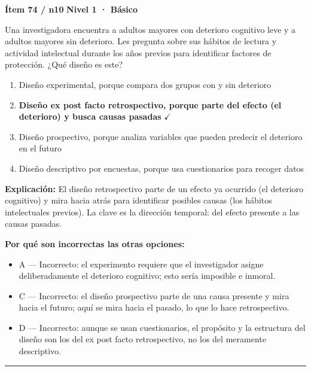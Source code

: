 \documentclass[12pt,a4paper]{article}
\begin{document}
\begin{mdframed}[backgroundcolor=fondogris,linecolor=azul,linewidth=1pt,innerleftmargin=10pt,innerrightmargin=10pt,innertopmargin=7pt,innerbottommargin=7pt]
\textbf{Ítem 74 / n10} \hfill {\small\bfseries\color{azul} Nivel 1 · Básico}
\end{mdframed}

Una investigadora encuentra a adultos mayores con deterioro cognitivo leve y a adultos mayores sin deterioro. Les pregunta sobre sus hábitos de lectura y actividad intelectual durante los años previos para identificar factores de protección. ¿Qué diseño es este?

\begin{enumerate}
  \item[A.] Diseño experimental, porque compara dos grupos con y sin deterioro
  \item[\textbf{\color{verde}B.}] \textbf{\color{verde} Diseño ex post facto retrospectivo, porque parte del efecto (el deterioro) y busca causas pasadas} \hfill $\checkmark$
  \item[C.] Diseño prospectivo, porque analiza variables que pueden predecir el deterioro en el futuro
  \item[D.] Diseño descriptivo por encuestas, porque usa cuestionarios para recoger datos
\end{enumerate}

\noindent\textbf{\color{azul}Explicación:} El diseño retrospectivo parte de un efecto ya ocurrido (el deterioro cognitivo) y mira hacia atrás para identificar posibles causas (los hábitos intelectuales previos). La clave es la dirección temporal: del efecto presente a las causas pasadas.

\noindent\textbf{\color{gris}Por qué son incorrectas las otras opciones:}
\begin{itemize}
  \item {\small A — Incorrecto: el experimento requiere que el investigador asigne deliberadamente el deterioro cognitivo; esto sería imposible e inmoral.}
  \item {\small C — Incorrecto: el diseño prospectivo parte de una causa presente y mira hacia el futuro; aquí se mira hacia el pasado, lo que lo hace retrospectivo.}
  \item {\small D — Incorrecto: aunque se usan cuestionarios, el propósito y la estructura del diseño son los del ex post facto retrospectivo, no los del meramente descriptivo.}
\end{itemize}
\vspace{8pt}\hrule\vspace{10pt}
\end{document}
